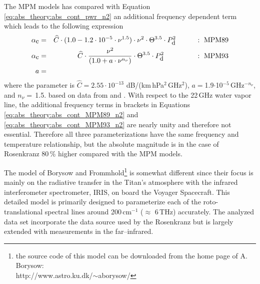 The MPM models has compared with Equation \ref{eq:abs_theory:abs_cont_pwr_n2} 
an additional frequency dependent term which leads to the 
following expression
\begin{eqnarray}
  \label{eq:abs_theory:abs_cont_MPM89_n2}
    \alphac &=& \widehat{C} \cdot (1.0-1.2\cdot10^{-5}\cdot
               \nu^{1.5}) \cdot \nu^2 \cdot \Theta^{3.5} \cdot \pda^2
               \hspace*{10mm}:~\mbox{MPM89}\\
%
  \label{eq:abs_theory:abs_cont_MPM93_n2}
    \alphac &=& \widehat{C} \cdot \frac{\nu^2}{(1.0+a\cdot \nu^{n_{\nu}})} 
                \cdot \Theta^{3.5} \cdot \pda^2
                \hspace*{16mm}:~\mbox{MPM93}\\
          a &=&  
\nonumber
\end{eqnarray}
where the parameter is $\widehat{C} = 2.55\cdot 10^{-13}$ dB/(km\,hPa$^2$\,GHz$^2$), 
$a=$1.9$\cdot$10$^{-5}$\,GHz$^{-n_{\nu}}$, and $n_{\nu}=$\,1.5.
based on data from \citet{stankevich:74} and \citet{stonenw:84}. 
With respect to the 22\,GHz water vapor line, 
the additional frequency terms in brackets in 
Equations \ref{eq:abs_theory:abs_cont_MPM89_n2} and \ref{eq:abs_theory:abs_cont_MPM93_n2}
are nearly unity and therefore not essential. Therefore all
three parameterizations have the same frequency and temperature
relationship, but the absolute magnitude is in the case of Rosenkranz
80\,\% higher compared with the MPM models.

The model of Borysow and Frommhold\footnote{{the source code of this
    model can be downloaded from the home page of A. Borysow:}\\
  http://www.astro.ku.dk/$\sim$aborysow/} is somewhat different since
their focus is mainly on the radiative transfer in the Titan's
atmosphere with the infrared interferometer spectrometer, IRIS, on
board the Voyager Spacecraft. This detailed model is primarily
designed to parameterize each of the roto-translational spectral lines
around 200\,cm$^{-1}$ ($\approx$ 6\,THz) accurately. The analyzed data
set incorporate the data source used by the Rosenkranz but is largely
extended with measurements in the far--infrared.



